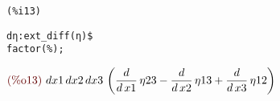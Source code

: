 \noindent
\begin{minipage}[t]{8ex}
\color{red}\bf
\begin{verbatim}
(%i13) 
\end{verbatim}
\end{minipage}
\begin{minipage}[t]{\textwidth}
\color{blue}
\begin{verbatim}
dη:ext_diff(η)$
factor(%);
\end{verbatim}
\end{minipage}
\begin{math}\displaystyle
\parbox{8ex}{\color{labelcolor}(\%o13) }
dx1\,dx2\,dx3\,\left( \frac{d}{d\,x1}\,\eta23-\frac{d}{d\,x2}\,\eta13+\frac{d}{d\,x3}\,\eta12\right) 
\end{math}
